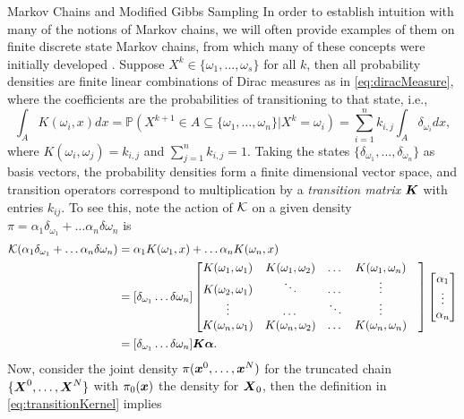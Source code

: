 \begin{chapter}{Markov Chains and Modified Gibbs Sampling}
In order to establish intuition with many of the notions of Markov chains, we will often provide examples of them on finite discrete state Markov chains, from which many of these concepts were initially developed \citep{billingsley2008probability}.
Suppose $X^k \in \{\omega_1,\dots,\omega_s\}$ for all $k$, then all probability densities are finite linear combinations of Dirac measures as in \eqref{eq:diracMeasure}, where the coefficients are the probabilities of transitioning to that state, i.e.,
\begin{equation}
  \int_A K(\omega_i,x)dx = \mathbb P( X^{k+1} \in A \subseteq \{\omega_1,\dots,\omega_n\}| X^k = \omega_{i} ) = \sum_{i=1}^n k_{i,j}\int_A \delta_{\omega_i} dx,
\end{equation}
where $K(\omega_i,\omega_j) = k_{i,j}$ and $\sum_{j=1}^n k_{i,j} = 1$.
Taking the states $\{\delta_{\omega_1},\dots,\delta_{\omega_n}\}$ as basis vectors, the probability densities form a finite dimensional vector space, and transition operators correspond to multiplication by a \emph{transition matrix} $\mbox{\boldmath$K$}$ with entries $k_{ij}$.
To see this, note the action of $\mathcal K$ on a given density $\pi = \alpha_1\delta_{\omega_1} + \dots \alpha_n\delta{\omega_n}$ is
\begin{align}
  \mathcal K (\alpha_1\delta_{\omega_1} + \dots \alpha_n\delta{\omega_n})
    &= \alpha_1K(\omega_1,x) + \dots \alpha_nK(\omega_n,x)\nonumber\\
    &= [\delta_{\omega_1}\dots \delta{\omega_n}]
    \begin{bmatrix}
      K(\omega_1,\omega_1) & K(\omega_1,\omega_2) & \dots & K(\omega_1,\omega_n)\\
      K(\omega_2,\omega_1) & \ddots & \dots & \vdots &\\
      \vdots & \dots & \ddots & \vdots &\\
      K(\omega_n,\omega_1) & K(\omega_n,\omega_2) & \dots & K(\omega_n,\omega_n)\\
    \end{bmatrix}
    \begin{bmatrix}
      \alpha_1\\
      \vdots\\
      \alpha_n
    \end{bmatrix}\nonumber\\
    &= [\delta_{\omega_1}\dots \delta{\omega_n}]\mbox{\boldmath$K$}\mbox{\boldmath$\alpha$}.
\end{align}
Now, consider the joint density $\pi(\mbox{\boldmath$x$}^0,\dots,\mbox{\boldmath$x$}^N)$ for the truncated chain $\{\mbox{\boldmath$X$}^0,\dots,\mbox{\boldmath$X$}^N\}$ with $\pi_0(\mbox{\boldmath$x$})$ the density for $\mbox{\boldmath$X$}_0$, then the definition in \eqref{eq:transitionKernel} implies

\end{chapter}
